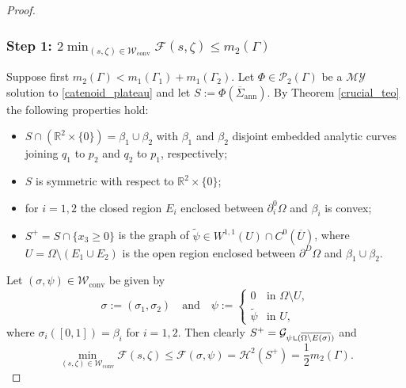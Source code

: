 \documentclass[11pt]{article}
\newcommand{\skpt}{\smallskip}
\numberwithin{equation}{section}
\newcommand{\R}{\mathbb{R}}
\let\Om\Omega
\newcommand\admclassconv{{\mathcal W_\mathrm{conv}}}
\newcommand{\immclosedann}{\Phi({\overline\Sigma}_\mathrm{ann})}
\newcommand{\resa}{\mathop{\hbox{\vrule height 7pt width 0.5pt depth 0pt
\vrule height 0.5pt width 6pt depth 0pt}}\nolimits}
\newcommand{\resb}{\mathop{\hbox{\vrule height 4pt width 0.5pt depth 0pt
\vrule height 0.5pt width 3pt depth 0pt}}\nolimits}
\newcommand{\res}{\mathchoice{\resa}{\resa}{\resb}{\resb}}
\theoremstyle{definition}
\begin{document}
\skpt
\begin{proof}\vspace*{-.5\baselineskip}
\subsubsection*{Step 1:
$2\min_{(s,\zeta)\in \admclassconv}\mathcal F(s,\zeta)\le m_2(\Gamma)$}

Suppose first $m_2(\Gamma)<m_1(\Gamma_1)+m_1(\Gamma_2)$.
Let $\Phi\in\mathcal{P}_2(\Gamma)$ be a $\mathcal{MY}$ solution to \eqref{catenoid_plateau} and let $S:=\immclosedann$. By Theorem \ref{crucial_teo} the following properties hold:
\begin{itemize}
\item $S\cap(\R^2\times\{0\})=\beta_1\cup\beta_2$ with $\beta_1$ and $\beta_2$ disjoint
embedded analytic curves joining $q_1$ to $p_2$ and $q_2$ to $p_1$, respectively;
\item $S$ is symmetric with respect to $\R^2\times\{0\}$;
\item for $i=1,2$ the closed
region $E_i$ enclosed between $\partial^0_i\Om$ and $\beta_i$ is convex;
\item $S^+=S\cap\{x_3\ge0\}$ is the graph of $\widetilde\psi\in W^{1,1}(U)\cap C^0(\overline U)$, where $U=\Om\setminus( E_1\cup E_2)$ is the open
region enclosed between $\partial^D\Om$ and $\beta_1\cup\beta_2$.
\end{itemize}
Let $(\sigma,\psi)\in\admclassconv$ be given by
\begin{equation*}
\sigma:=(\sigma_1,\sigma_2)\quad\text{and}\quad\psi:=\begin{cases}
0&\text{in } \Om\setminus U,
\\
\widetilde{\psi}&\text{in } U,
\end{cases}
\end{equation*}
where $\sigma_i([0,1])=\beta_i$ for $i=1,2$.
Then clearly $S^+=\mathcal{G}_{\psi\res(\overline{\Om\setminus E(\sigma)})}$ and
\begin{equation*}
\min_{(s,\zeta)\in\admclassconv}\mathcal{F}(s,\zeta)\le \mathcal{F}(\sigma,\psi)=\mathcal{H}^2(S^+)=\frac12m_2(\Gamma).
\end{equation*}


\end{proof}
\end{document}
